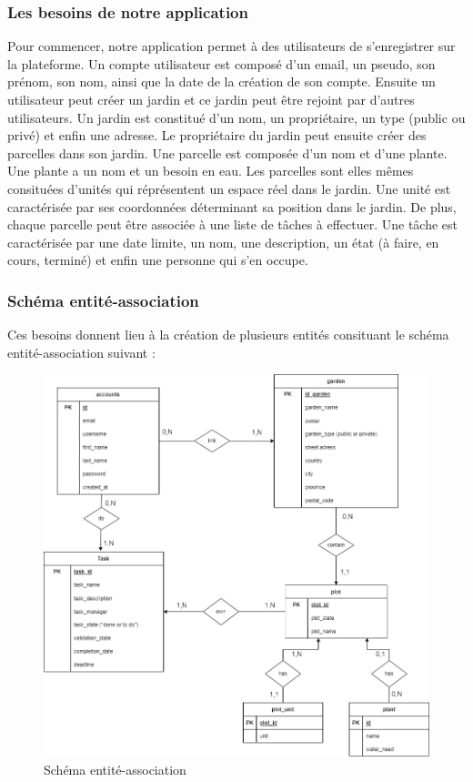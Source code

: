 \documentclass[french,a4paper]{article}
\begin{document}
\subsubsection{Les besoins de notre application}
Pour commencer, notre application permet à des utilisateurs de s'enregistrer sur la plateforme. Un compte utilisateur est composé d'un
email, un pseudo, son prénom, son nom, ainsi que la date de la création de son compte. Ensuite un utilisateur peut créer un jardin
et ce jardin peut être rejoint par d'autres utilisateurs.
Un jardin est constitué d'un nom, un propriétaire, un type (public ou privé) et enfin une adresse. Le propriétaire du jardin peut
ensuite créer des parcelles dans son jardin. Une parcelle est composée d'un nom et d'une plante. Une plante a un nom et un besoin en eau. Les parcelles sont elles mêmes consituées
d'unités qui réprésentent un espace réel dans le jardin. Une unité est caractérisée par ses coordonnées déterminant sa position dans le jardin.
De plus, chaque parcelle peut être associée à une liste de tâches à effectuer. Une tâche est caractérisée par une date limite, un nom,
une description, un état (à faire, en cours, terminé) et enfin une personne qui s'en occupe.

\subsubsection{Schéma entité-association}

Ces besoins donnent lieu à la création de plusieurs entités consituant le schéma entité-association suivant :

\begin{figure}[H]
    \centering
    \includegraphics[width=1\textwidth]{img/Schema_entite_association_PPIIversion2.drawio.png}
    \caption{Schéma entité-association}
\end{figure}
\end{document}

